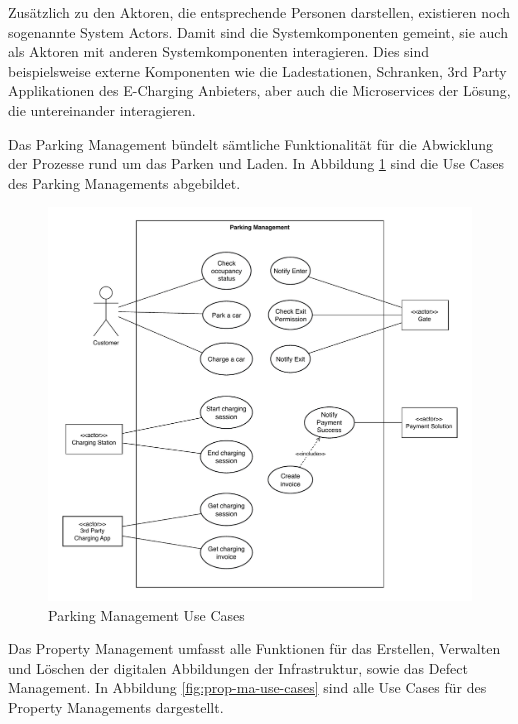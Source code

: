 Zusätzlich zu den Aktoren, die entsprechende Personen darstellen, existieren noch sogenannte System Actors. Damit sind die Systemkomponenten gemeint, sie auch als Aktoren mit anderen Systemkomponenten interagieren. Dies sind beispielsweise externe Komponenten wie die Ladestationen, Schranken, 3rd Party Applikationen des E-Charging Anbieters, aber auch die Microservices der Lösung, die untereinander interagieren.

Das Parking Management bündelt sämtliche Funktionalität für die Abwicklung der Prozesse rund um das Parken und Laden. In Abbildung \ref{fig:park-ma-use-cases} sind die Use Cases des Parking Managements abgebildet.

\begin{figure}[ht]
    \centering
    \includegraphics[width=\textwidth]{resources/park-ma-use-cases.pdf}
    \caption{Parking Management Use Cases}
    \label{fig:park-ma-use-cases}
\end{figure}

Das Property Management umfasst alle Funktionen für das Erstellen, Verwalten und Löschen der digitalen Abbildungen der Infrastruktur, sowie das Defect Management.
In Abbildung \ref{fig:prop-ma-use-cases} sind alle Use Cases für des Property Managements dargestellt.

